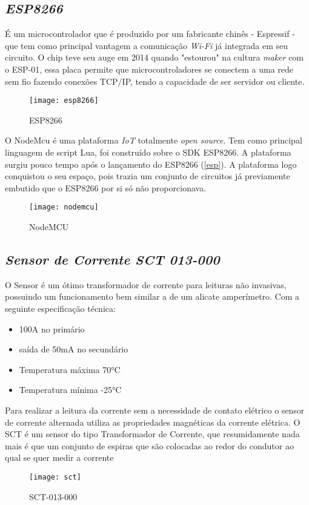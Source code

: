 \subsection[\textit{ESP8266}]{\textit{ESP8266}}\label{esp}
É um microcontrolador que é produzido por um fabricante chinês - Espressif - que tem como principal vantagem a comunicação \textit{Wi-Fi} já integrada em seu circuito.
O chip teve seu auge em 2014 quando "estourou" na cultura \textit{maker} com o ESP-01, essa placa permite que microcontroladores se conectem a uma rede
sem fio  fazendo conexões TCP/IP, tendo a capacidade de ser servidor ou cliente.

\begin{figure}[h!]
	\texttt{[image: esp8266]}
	\centering
	\caption[ESP8266]{ESP8266}
	\label{fig:esp8266}
\end{figure}
\FloatBarrier

O NodeMcu é uma plataforma \textit{IoT} totalmente \textit{open source}. Tem como principal linguagem de script Lua, foi construído sobre o SDK ESP8266.
A plataforma surgiu pouco tempo após o lançamento do ESP8266 (\autoref{esp}). A plataforma logo conquistou o seu espaço, pois trazia um conjunto
de circuitos já previamente embutido que o ESP8266 por si só não proporcionava.

\begin{figure}[h!]
	\texttt{[image: nodemcu]}
	\centering
	\caption[NodeMCU]{NodeMCU}
	\label{fig:nodemcu}
\end{figure}
\FloatBarrier

\subsection[\textit{Sensor de Corrente SCT 013-000}]{\textit{Sensor de Corrente SCT 013-000}}\label{sct}
O Sensor é um ótimo transformador de corrente para leituras não invasivas, possuindo um funcionamento bem similar a de um alicate amperímetro. Com a seguinte especificação
técnica: 
\begin{itemize}
	\item 100A no primário
	\item saída de 50mA no secundário
	\item Temperatura máxima \ang{70}C
	\item Temperatura mínima \ang{-25}C
\end{itemize} 
Para realizar a leitura da corrente sem a necessidade de contato elétrico o sensor de corrente alternada utiliza as propriedades 
magnéticas da corrente elétrica. O SCT é um sensor do tipo Transformador de Corrente, que resumidamente nada mais é que um conjunto de espiras que são
colocadas ao redor do condutor ao qual se quer medir a corrente 

\begin{figure}[h!]
	\texttt{[image: sct]}
	\centering
	\caption[SCT-013-000]{SCT-013-000}
	\label{fig:sct}
\end{figure}
\FloatBarrier
